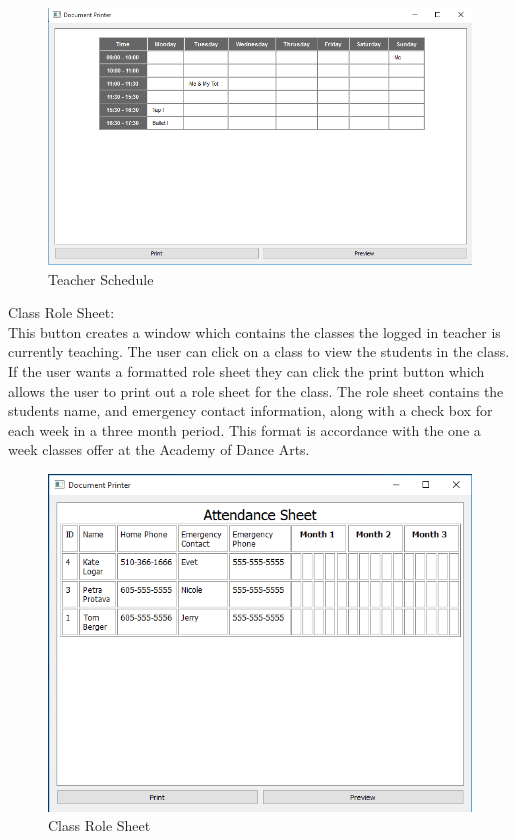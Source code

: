 \begin{figure}
  \includegraphics[width=\linewidth]{pics/userGuide/teacherSchedule.png}
  \caption{Teacher Schedule}
  \label{fig:User doc: Teacher Schedule}
\end{figure}


Class Role Sheet:\\
This button creates a window which contains the classes the logged in teacher is currently teaching. The user can click on a class to view the students in the class. If the user wants a formatted role sheet they can click the print button which allows the user to print out a role sheet for the class. The role sheet contains the students name, and emergency contact information, along with a check box for each week in a three month period. This format is accordance with the one a week classes offer at the Academy of Dance Arts.\\

\begin{figure}
  \includegraphics[width=\linewidth]{pics/userGuide/role.png}
  \caption{Class Role Sheet}
  \label{fig:User doc: Class Role Sheet}
\end{figure}

